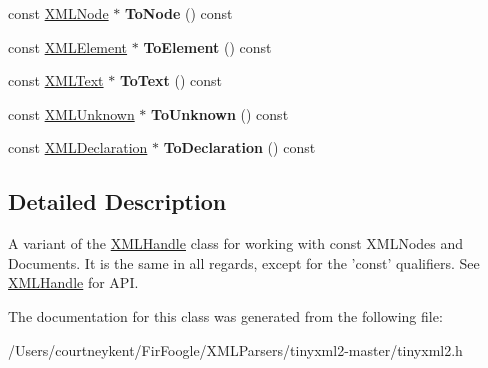 \begin{DoxyCompactItemize}
\item 
\hypertarget{classtinyxml2_1_1_x_m_l_const_handle_a95d0256318c10c3f75fa5f8ffb3e4bc1}{const \hyperlink{classtinyxml2_1_1_x_m_l_node}{X\+M\+L\+Node} $\ast$ {\bfseries To\+Node} () const }\label{classtinyxml2_1_1_x_m_l_const_handle_a95d0256318c10c3f75fa5f8ffb3e4bc1}

\item 
\hypertarget{classtinyxml2_1_1_x_m_l_const_handle_a5a48adefc2a5e70d4ce5b55692a0e2f9}{const \hyperlink{classtinyxml2_1_1_x_m_l_element}{X\+M\+L\+Element} $\ast$ {\bfseries To\+Element} () const }\label{classtinyxml2_1_1_x_m_l_const_handle_a5a48adefc2a5e70d4ce5b55692a0e2f9}

\item 
\hypertarget{classtinyxml2_1_1_x_m_l_const_handle_ad86ca7dbb20d0495ae357fe7a866e0be}{const \hyperlink{classtinyxml2_1_1_x_m_l_text}{X\+M\+L\+Text} $\ast$ {\bfseries To\+Text} () const }\label{classtinyxml2_1_1_x_m_l_const_handle_ad86ca7dbb20d0495ae357fe7a866e0be}

\item 
\hypertarget{classtinyxml2_1_1_x_m_l_const_handle_acb358a329e54fa204ed2d0b181566828}{const \hyperlink{classtinyxml2_1_1_x_m_l_unknown}{X\+M\+L\+Unknown} $\ast$ {\bfseries To\+Unknown} () const }\label{classtinyxml2_1_1_x_m_l_const_handle_acb358a329e54fa204ed2d0b181566828}

\item 
\hypertarget{classtinyxml2_1_1_x_m_l_const_handle_a5de0c175845bc30a6f9b3d88d8877eaf}{const \hyperlink{classtinyxml2_1_1_x_m_l_declaration}{X\+M\+L\+Declaration} $\ast$ {\bfseries To\+Declaration} () const }\label{classtinyxml2_1_1_x_m_l_const_handle_a5de0c175845bc30a6f9b3d88d8877eaf}

\end{DoxyCompactItemize}


\subsection{Detailed Description}
A variant of the \hyperlink{classtinyxml2_1_1_x_m_l_handle}{X\+M\+L\+Handle} class for working with const X\+M\+L\+Nodes and Documents. It is the same in all regards, except for the 'const' qualifiers. See \hyperlink{classtinyxml2_1_1_x_m_l_handle}{X\+M\+L\+Handle} for A\+P\+I. 

The documentation for this class was generated from the following file\+:\begin{DoxyCompactItemize}
\item 
/\+Users/courtneykent/\+Fir\+Foogle/\+X\+M\+L\+Parsers/tinyxml2-\/master/tinyxml2.\+h\end{DoxyCompactItemize}

